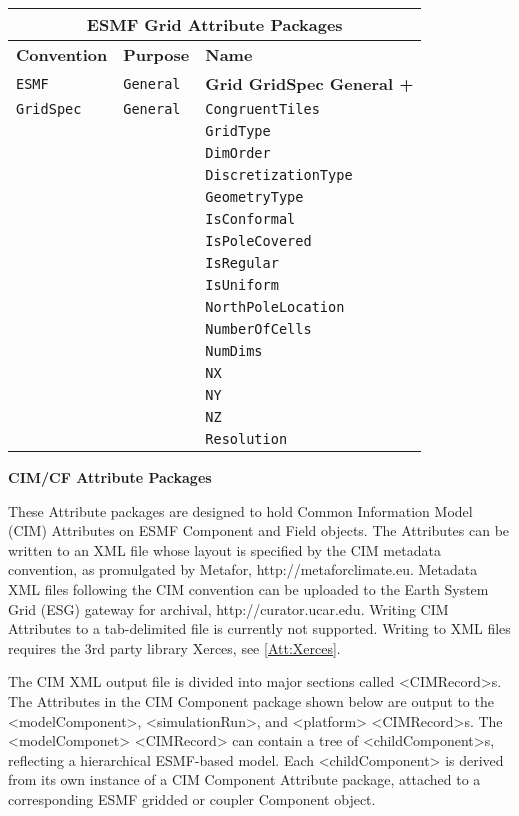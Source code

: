 \vspace{5pt}
\label{GridAttributePackages}
\begin{tabular}{|p{4cm}|p{4cm}|p{6cm}|}
\hline
\multicolumn{3}{|c|}{{\bf \large ESMF Grid Attribute Packages}} \\
\hline\hline
{\bf Convention} & {\bf Purpose} & {\bf Name} \\
\hline\hline
{\tt ESMF} & {\tt General} & {\bf Grid GridSpec General +} \\
{\tt GridSpec} & {\tt General} & {\tt CongruentTiles} \\
 & & {\tt GridType} \\ 
 & & {\tt DimOrder} \\ 
 & & {\tt DiscretizationType} \\ 
 & & {\tt GeometryType} \\ 
 & & {\tt IsConformal} \\ 
 & & {\tt IsPoleCovered} \\ 
 & & {\tt IsRegular} \\ 
 & & {\tt IsUniform} \\ 
 & & {\tt NorthPoleLocation} \\ 
 & & {\tt NumberOfCells} \\ 
 & & {\tt NumDims} \\ 
 & & {\tt NX} \\ 
 & & {\tt NY} \\ 
 & & {\tt NZ} \\ 
 & & {\tt Resolution} \\ 
\hline
\end{tabular}

\vspace{8pt}
{\bf \large CIM/CF Attribute Packages}

These Attribute packages are designed to hold Common Information Model (CIM) Attributes on ESMF Component and Field objects. The Attributes can be written to an XML file whose layout is specified by the CIM metadata convention, as promulgated by Metafor, http://metaforclimate.eu.  Metadata XML files following the CIM convention can be uploaded to the Earth System Grid (ESG) gateway for archival, http://curator.ucar.edu.  Writing CIM Attributes to a tab-delimited file is currently not supported.  Writing to XML files requires the 3rd party library Xerces, see \ref{Att:Xerces}.

The CIM XML output file is divided into major sections called <CIMRecord>s.  The Attributes in the CIM Component package shown below are output to the <modelComponent>, <simulationRun>, and <platform> <CIMRecord>s.  The <modelComponet> <CIMRecord> can contain a tree of <childComponent>s, reflecting a hierarchical ESMF-based model.  Each <childComponent> is derived from its own instance of a CIM Component Attribute package, attached to a corresponding ESMF gridded or coupler Component object.

